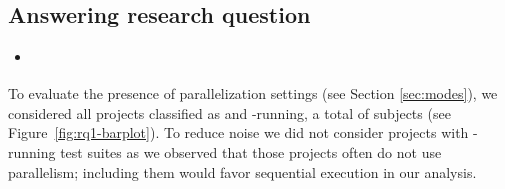 




\subsection{Answering research question \numRQC{}}
\label{sec:rqC}

\begin{itemize}
    \item \emph{\RQC}
\end{itemize}

To evaluate the presence of parallelization settings (see Section
\ref{sec:modes}), we considered all projects classified as \medg{} and
\longg{}-running, a total of \numMedLong{} subjects (see
Figure~\ref{fig:rq1-barplot}). To reduce noise we did not consider
projects with \shortg{}-running test suites as we observed that those projects often do not use parallelism;
including them would favor sequential execution in our analysis.

